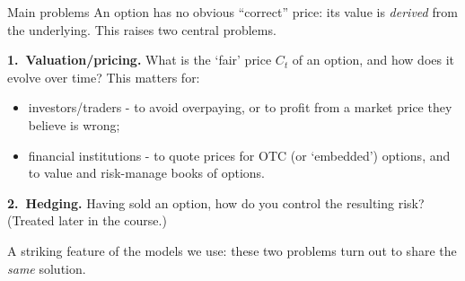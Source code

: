 \documentclass[pdf, handout]{beamer}
\begin{document}
\begin{frame}{Main problems}
An option has no obvious ``correct'' price: its value is \emph{derived} from the underlying. This raises two central problems.
\medskip

\textbf{1.\ Valuation/pricing.} What is the `fair' price $C_t$ of an option, and how does it evolve over time? This matters for:
\begin{itemize}
\item investors/traders - to avoid overpaying, or to profit from a market price they believe is wrong;
\item financial institutions - to quote prices for OTC (or `embedded') options, and to value and risk-manage books of options.
\end{itemize}
\medskip

\textbf{2.\ Hedging.} Having sold an option, how do you control the resulting risk? (Treated later in the course.)
\medskip

A striking feature of the models we use: these two problems turn out to share the \emph{same} solution.
\end{frame}
\end{document}
